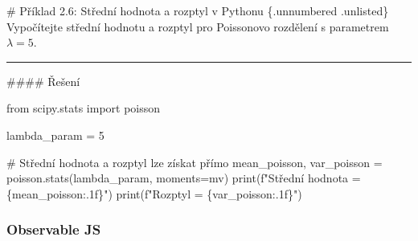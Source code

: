 \documentclass[
  czech,
  11pt,
  letterpaper,
  DIV=11,
  numbers=noendperiod]{scrreprt}
\newenvironment{Shaded}{\begin{snugshade}}{\end{snugshade}}
\newcommand{\BuiltInTok}[1]{\textcolor[rgb]{0.00,0.23,0.31}{#1}}
\newcommand{\CommentTok}[1]{\textcolor[rgb]{0.37,0.37,0.37}{#1}}
\newcommand{\DecValTok}[1]{\textcolor[rgb]{0.68,0.00,0.00}{#1}}
\newcommand{\ImportTok}[1]{\textcolor[rgb]{0.00,0.46,0.62}{#1}}
\newcommand{\NormalTok}[1]{\textcolor[rgb]{0.00,0.23,0.31}{#1}}
\newcommand{\OperatorTok}[1]{\textcolor[rgb]{0.37,0.37,0.37}{#1}}
\newcommand{\SpecialCharTok}[1]{\textcolor[rgb]{0.37,0.37,0.37}{#1}}
\newcommand{\SpecialStringTok}[1]{\textcolor[rgb]{0.13,0.47,0.30}{#1}}
\newcommand{\StringTok}[1]{\textcolor[rgb]{0.13,0.47,0.30}{#1}}
\begin{document}
\begin{tcolorbox}[enhanced jigsaw, arc=.35mm, bottomrule=.15mm, bottomtitle=1mm, breakable, colback=white, colbacktitle=quarto-callout-note-color!10!white, colframe=quarto-callout-note-color-frame, coltitle=black, left=2mm, leftrule=.75mm, opacityback=0, opacitybacktitle=0.6, rightrule=.15mm, title=\textcolor{quarto-callout-note-color}{\faInfo}\hspace{0.5em}{Poznámka}, titlerule=0mm, toprule=.15mm, toptitle=1mm]

\# Příklad 2.6: Střední hodnota a rozptyl v Pythonu \{.unnumbered
.unlisted\} Vypočítejte střední hodnotu a rozptyl pro Poissonovo
rozdělení s parametrem \(\lambda=5\).

\begin{center}\rule{0.5\linewidth}{0.5pt}\end{center}

\#\#\#\# Řešení

\begin{Shaded}
\begin{Highlighting}[]
\ImportTok{from}\NormalTok{ scipy.stats }\ImportTok{import}\NormalTok{ poisson}

\NormalTok{lambda\_param }\OperatorTok{=} \DecValTok{5}

\CommentTok{\# Střední hodnota a rozptyl lze získat přímo}
\NormalTok{mean\_poisson, var\_poisson }\OperatorTok{=}\NormalTok{ poisson.stats(lambda\_param, moments}\OperatorTok{=}\StringTok{\textquotesingle{}mv\textquotesingle{}}\NormalTok{)}
\BuiltInTok{print}\NormalTok{(}\SpecialStringTok{f"Střední hodnota = }\SpecialCharTok{\{}\NormalTok{mean\_poisson}\SpecialCharTok{:.1f\}}\SpecialStringTok{"}\NormalTok{)}
\BuiltInTok{print}\NormalTok{(}\SpecialStringTok{f"Rozptyl = }\SpecialCharTok{\{}\NormalTok{var\_poisson}\SpecialCharTok{:.1f\}}\SpecialStringTok{"}\NormalTok{)}
\end{Highlighting}
\end{Shaded}

\end{tcolorbox}

\subsubsection*{Observable JS}\label{observable-js-1}
\end{document}
